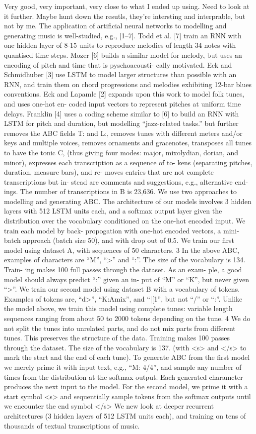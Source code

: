 \cite{Sturm2015} Very good, very important, very close to what I ended up using. Need to look at it further. Maybe hunt down the resutls, they're intersting and interprable, but not by me. The application of artificial neural networks to modelling and generating music is well-studied, e.g., [1–7]. Todd et al. [7] train an RNN with one hidden layer of 8-15 units to reproduce melodies of length 34 notes with quantised time steps. Mozer [6] builds a similar model for melody, but uses an encoding of pitch and time that is pyschoacousti- cally motivated. Eck and Schmidhuber [3] use LSTM to model larger structures than possible with an RNN, and train them on chord progressions and melodies exhibiting 12-bar blues conventions. Eck and Lapamle [2] expands upon this work to model folk tunes, and uses one-hot en- coded input vectors to represent pitches at uniform time delays. Franklin [4] uses a coding scheme similar to [6] to build an RNN with LSTM for pitch and duration, but modelling “jazz-related tasks.” but further removes the ABC fields T: and L:, removes tunes with different meters and/or keys and multiple voices, removes ornaments and gracenotes, transposes all tunes to have the tonic C, (thus giving four modes: major, mixolydian, dorian, and minor), expresses each transcription as a sequence of to- kens (separating pitches, duration, measure bars), and re- moves entries that are not complete transcriptions but in- stead are comments and suggestions, e.g., alternative end- ings. The number of transcriptions in B is 23,636. We use two approaches to modelling and generating ABC. The architecture of our models involves 3 hidden layers with 512 LSTM units each, and a softmax output layer given the distribution over the vocabulary conditioned on the one-hot encoded input. We train each model by back- propogation with one-hot encoded vectors, a mini-batch approach (batch size 50), and with drop out of 0.5. We train our first model using dataset A, with sequences of 50 characters. 3 In the above ABC, examples of characters are “M”, “>” and “:”. The size of the vocabulary is 134. Train- ing makes 100 full passes through the dataset. As an exam- ple, a good model should always predict “:” given an in- put of “M” or “K”, but never given “>”. We train our second model using dataset B with a vocabulary of tokens. Examples of tokens are, “d>”, “K:Amix”, and “|[1”, but not “/” or “:”. Unlike the model above, we train this model using complete tunes: variable length sequences ranging from about 50 to 2000 tokens depending on the tune. 4 We do not split the tunes into unrelated parts, and do not mix parts from different tunes. This preserves the structure of the data. Training makes 100 passes through the dataset. The size of the vocabulary is 137. (with <s> and </s> to mark the start and the end of each tune). To generate ABC from the first model we merely prime it with input text, e.g., “M: 4/4”, and sample any number of times from the distribution at the softmax output. Each generated charamcter produces the next input to the model. For the second model, we prime it with a start symbol <s> and sequentially sample tokens from the softmax outputs until we encounter the end symbol </s> We new look at deeper recurrent architectures (3 hidden layers of 512 LSTM units each), and training on tens of thousands of textual transcriptions of music.
